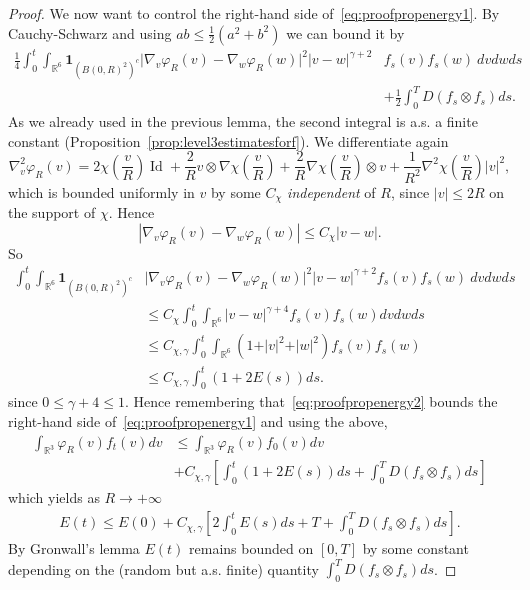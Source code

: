 \documentclass[11pt,a4paper]{article}
\theoremstyle{definition}
\theoremstyle{plain}
\DeclareMathOperator*{\Id}{Id}
\begin{document}
\begin{proof}
    We now want to control the right-hand side of~\eqref{eq:proofpropenergy1}. By Cauchy-Schwarz and using $ab\leq \frac{1}{2}(a^2+b^2)$ we can bound it by
    \begin{align}
    \label{eq:proofpropenergy2}
     \frac{1}{4}
        \int_0^t \int_{\mathbb{R}^6}\mathbf{1}_{(B(0,R)^2)^c} \vert \nabla_v\varphi_R(v) - \nabla_w\varphi_R(w)\vert^2 \vert v-w\vert^{\gamma+2} &f_s(v) f_s(w)\ dvdwds \nonumber\\
        &+\frac{1}{2}\int_0^T D(f_s\otimes f_s)ds .
    \end{align}
    As we already used in the previous lemma, the second integral is a.s. a finite constant (Proposition~\ref{prop:level3estimatesforf}).
    We differentiate again
    $$\nabla^2_v\varphi_R(v) = 2 \chi\left(\frac{v}{R}\right)\Id +\frac{2}{R}v \otimes \nabla\chi\left(\frac{v}{R}\right) +\frac{2}{R}\nabla\chi\left(\frac{v}{R}\right)\otimes v + \frac{1}{R^2}\nabla^2\chi\left(\frac{v}{R}\right) \vert v\vert^2,$$
    which is bounded uniformly in $v$ by some $C_\chi$ \textit{independent} of $R$, since $\vert v \vert \leq 2R$ on the support of $\chi$. Hence
    $$\left\vert \nabla_v\varphi_R(v) - \nabla_w\varphi_R(w)\right\vert \leq C_\chi \vert v-w\vert.$$
    So
    \begin{align}
    \label{eq:proofpropenergy3}
        \int_0^t \int_{\mathbb{R}^6} \mathbf{1}_{(B(0,R)^2)^c}&\vert \nabla_v\varphi_R(v) - \nabla_w\varphi_R(w)\vert^2 \vert v-w\vert^{\gamma+2} f_s(v) f_s(w)\ dvdwds\nonumber\\
        & \leq C_\chi \int_0^t \int_{\mathbb{R}^6} \vert v-w\vert^{\gamma+4} f_s(v) f_s(w) dvdwds\nonumber\\
        &\leq C_{\chi,\gamma}\int_0^t \int_{\mathbb{R}^6} (1+\vert v \vert^2+\vert w \vert^2) f_s(v) f_s(w)\nonumber\\
        &\leq C_{\chi,\gamma}\int_0^t (1+2E(s))ds.
    \end{align}
    since $0\leq \gamma+4 \leq 1$.
    Hence remembering that~\eqref{eq:proofpropenergy2} bounds the right-hand side of~\eqref{eq:proofpropenergy1} and using the above,
    \begin{align*}
     \int_{\mathbb{R}^3} \varphi_R(v) f_t(v)dv&\leq \int_{\mathbb{R}^3} \varphi_R(v) f_0(v) dv\\
     &+C_{\chi,\gamma} \left[\int_0^t (1+2E(s))ds +  \int_0^T D(f_s\otimes f_s)ds\right]
    \end{align*}
    which yields as $R\rightarrow +\infty$
    \begin{align*}
     E(t)\leq E(0)+C_{\chi,\gamma} \left[2\int_0^t E(s)ds + T + \int_0^T D(f_s\otimes f_s)ds\right].
    \end{align*}
    By Gronwall's lemma $E(t)$ remains bounded on $[0,T]$ by some constant depending on the (random but a.s. finite) quantity $\int_0^T D(f_s\otimes f_s)ds$.


\end{proof}
\end{document}
